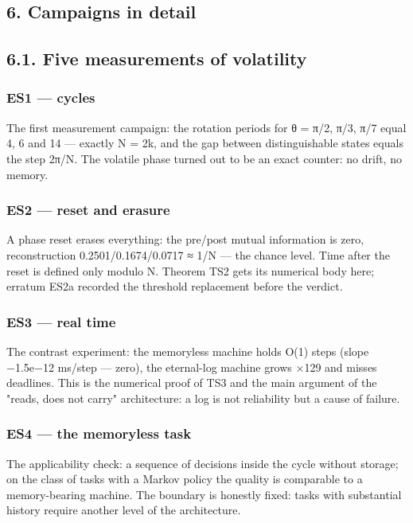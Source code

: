 \documentclass[11pt,a4paper]{article}
\begin{document}
\subsection{6. Campaigns in detail}

\subsection{6.1. Five measurements of volatility}

\subsubsection{ES1 — cycles}

The first measurement campaign: the rotation periods for θ = π/2, π/3, π/7 equal 4, 6 and 14 — exactly N = 2k, and the gap between distinguishable states equals the step 2π/N. The volatile phase turned out to be an exact counter: no drift, no memory.

\subsubsection{ES2 — reset and erasure}

A phase reset erases everything: the pre/post mutual information is zero, reconstruction 0.2501/0.1674/0.0717 ≈ 1/N — the chance level. Time after the reset is defined only modulo N. Theorem TS2 gets its numerical body here; erratum ES2a recorded the threshold replacement before the verdict.

\subsubsection{ES3 — real time}

The contrast experiment: the memoryless machine holds O(1) steps (slope −1.5e−12 ms/step — zero), the eternal-log machine grows ×129 and misses deadlines. This is the numerical proof of TS3 and the main argument of the "reads, does not carry" architecture: a log is not reliability but a cause of failure.

\subsubsection{ES4 — the memoryless task}

The applicability check: a sequence of decisions inside the cycle without storage; on the class of tasks with a Markov policy the quality is comparable to a memory-bearing machine. The boundary is honestly fixed: tasks with substantial history require another level of the architecture.
\end{document}
